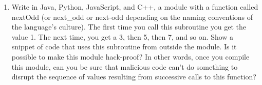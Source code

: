 \documentclass{article}
\begin{document}
\begin{enumerate}
	\pagebreak
	\item Write in Java, Python, JavaScript, and C++, a module with a function called nextOdd (or next\_odd or next-odd depending on the naming conventions of the language's culture). The first time you call this subroutine you get the value 1. The next time, you get a 3, then 5, then 7, and so on. Show a snippet of code that uses this subroutine from outside the module. Is it possible to make this module hack-proof? In other words, once you compile this module, can you be sure that malicious code can't do something to disrupt the sequence of values resulting from successive calls to this function?
\end{enumerate}
\end{document}
